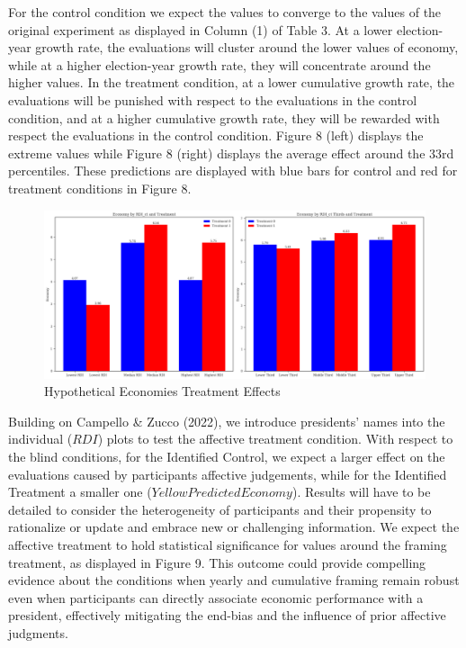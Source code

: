 \documentclass[
]{article}
\begin{document}
\begin{center}
  
\end{center}

For the control condition we expect the values to converge to the values
of the original experiment as displayed in Column (1) of Table 3. At a
lower election-year growth rate, the evaluations will cluster around the
lower values of economy, while at a higher election-year growth rate,
they will concentrate around the higher values. In the treatment
condition, at a lower cumulative growth rate, the evaluations will be
punished with respect to the evaluations in the control condition, and
at a higher cumulative growth rate, they will be rewarded with respect
the evaluations in the control condition. Figure 8 (left) displays the
extreme values while Figure 8 (right) displays the average effect around
the 33rd percentiles. These predictions are displayed with blue bars for
control and red for treatment conditions in Figure 8.

\begin{figure}
\hypertarget{fig:label}{%
\centering
\includegraphics[width=1\textwidth,height=1\textheight]{treat_lowthird.png}
\caption{Hypothetical Economies Treatment Effects}\label{fig:label}
}
\end{figure}

Building on Campello \& Zucco (2022), we introduce presidents' names
into the individual (\(RDI\)) plots to test the affective treatment
condition. With respect to the blind conditions, for the Identified
Control, we expect a larger effect on the evaluations caused by
participants affective judgements, while for the Identified Treatment a
smaller one (\(Yellow Predicted Economy\)). Results will have to be
detailed to consider the heterogeneity of participants and their
propensity to rationalize or update and embrace new or challenging
information. We expect the affective treatment to hold statistical
significance for values around the framing treatment, as displayed in
Figure 9. This outcome could provide compelling evidence about the
conditions when yearly and cumulative framing remain robust even when
participants can directly associate economic performance with a
president, effectively mitigating the end-bias and the influence of
prior affective judgments.
\end{document}
